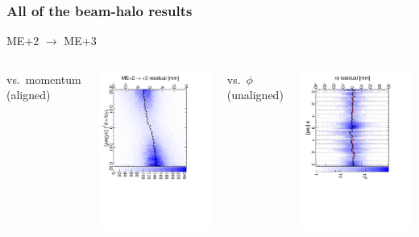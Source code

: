 \documentclass[compress]{beamer}
\begin{document}
\begin{frame}
\frametitle{All of the beam-halo results}

\begin{center}
ME$+$2 $\to$ ME$+$3
\end{center}

\begin{columns}
\centering vs.\ momentum (aligned)

\includegraphics[height=\linewidth, angle=90]{linear_mep2to3.pdf}

\centering vs.\ $\phi$ (unaligned)

\includegraphics[height=\linewidth, angle=90]{diskiter01_p2to3.pdf}


\end{columns}
\end{frame}
\end{document}
